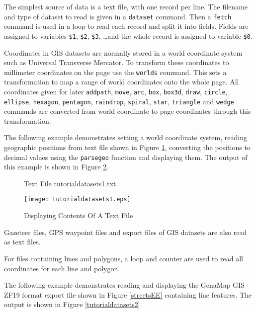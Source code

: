 The simplest source of data is a text file, with one record per line.  The
filename and type of dataset to read is given in a \texttt{dataset} command.
Then a \texttt{fetch} command is used in a loop to read each record
and split it into fields.
Fields are assigned to variables
\texttt{\$1}, \texttt{\$2}, \texttt{\$3}, \dots and the whole record is
assigned to variable \texttt{\$0}.

Coordinates in GIS datasets are normally stored
in a world coordinate system such as
Universal Transverse Mercator.  To transform these coordinates to millimeter
coordinates on the page use the \texttt{worlds} command.  This sets a
transformation to map a range of world coordinates onto the whole page.  All
coordinates given for later \texttt{addpath}, \texttt{move}, \texttt{arc},
\texttt{box},
\texttt{box3d},
\texttt{draw},
\texttt{circle},
\texttt{ellipse},
\texttt{hexagon},
\texttt{pentagon},
\texttt{raindrop},
\texttt{spiral},
\texttt{star},
\texttt{triangle}
and
\texttt{wedge}
commands are converted from world coordinate to page coordinates
through this transformation.

The following example demonstrates
setting a world coordinate system,
reading geographic positions from text file shown in Figure
\ref{tutorialdatasets1txt}, converting the positions to decimal
values using the \texttt{parsegeo} function and displaying them.
The output of this example is shown in
Figure \ref{tutorialdatasets1}.

\begin{figure}[htb]

\caption{Text File tutorialdatasets1.txt}
\label{tutorialdatasets1txt}
\end{figure}



\begin{figure}[htb]
\texttt{[image: tutorialdatasets1.eps]}
\caption{Displaying Contents Of A Text File}
\label{tutorialdatasets1}
\end{figure}

Gazeteer files, GPS waypoint files and export files of GIS datasets
are also read as text files.

For files containing lines and polygons, a loop and counter
are used to read all coordinates for each line and polygon.

The following example demonstrates
reading and displaying the GenaMap GIS ZF19 format export file shown in Figure
\ref{streetsEE} containing line
features.
The output is shown in Figure \ref{tutorialdatasets2}.

